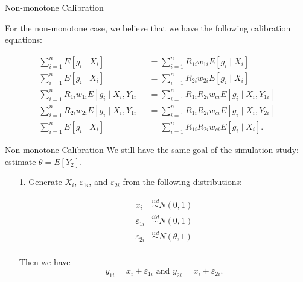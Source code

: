 \documentclass{beamer} %
\begin{document}
\begin{frame}

    

\end{frame}

\begin{frame}

    

\end{frame}

\begin{frame}

    

\end{frame}

\begin{frame}{Non-monotone Calibration}

    For the non-monotone case,
    we believe that we have the following calibration equations:

    \begin{align*}
      \sum_{i = 1}^n E[g_i \mid X_i] &= \sum_{i = 1}^n R_{1i} w_{1i} E[g_i \mid
      X_i]\\
      \sum_{i = 1}^n E[g_i \mid X_i] &= \sum_{i = 1}^n R_{2i} w_{2i} E[g_i \mid
      X_i]\\
      \sum_{i = 1}^n R_{1i} w_{1i} E[g_i \mid X_i, Y_{1i}] &= \sum_{i = 1}^n
      R_{1i} R_{2i} w_{ci} E[g_i \mid X_i, Y_{1i}]\\
      \sum_{i = 1}^n R_{2i} w_{2i} E[g_i \mid X_i, Y_{1i}] &= \sum_{i = 1}^n
      R_{1i} R_{2i} w_{ci} E[g_i \mid X_i, Y_{2i}]\\
      \sum_{i = 1}^n E[g_i \mid X_i] &= \sum_{i = 1}^n R_{1i} R_{2i} w_{ci}
      E[g_i \mid X_i].
    \end{align*}
  
\end{frame}

\begin{frame}{Non-monotone Calibration}
  We still have the same goal of the simulation study: estimate $\theta =
    E[Y_2]$.

    \begin{enumerate}
      \item[1.] Generate $X_i$, $\varepsilon_{1i}$, and $\varepsilon_{2i}$ from the
        following distributions:

        \begin{align*}
          x_i &\stackrel{iid}{\sim} N(0, 1)\\
          \varepsilon_{1i} &\stackrel{iid}{\sim} N(0, 1)\\
          \varepsilon_{2i} &\stackrel{iid}{\sim} N(\theta, 1)\\
        \end{align*}

        Then we have
        \[y_{1i} = x_i + \varepsilon_{1i} \text{ and } y_{2i} = x_i +
        \varepsilon_{2i}.\]

    \end{enumerate}

\end{frame}
\end{document}
